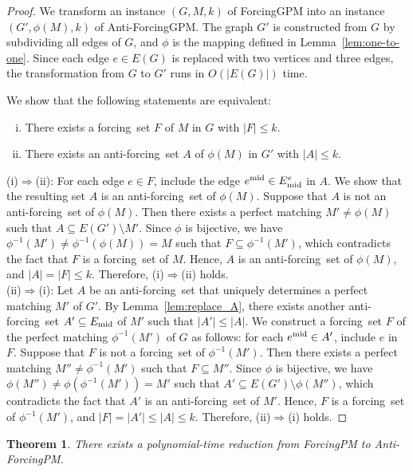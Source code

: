\documentclass[a4paper,10pt]{article}
\newtheorem{theorem}{Theorem}
\newcommand{\FS}{\rm forcing~set}
\newcommand{\AFS}{\rm anti-forcing~set}
\newcommand{\FGPM}{\sc ForcingGPM} %
\newcommand{\AFGPM}{\sc Anti-ForcingGPM}
\newcommand{\FPM}{\sc ForcingPM} %
\newcommand{\AFPM}{\sc Anti-ForcingPM}
\begin{document}
\begin{proof}
We transform an instance $(G, M, k)$ of {\FGPM} into an instance $(G', \phi(M), k)$ of {\AFGPM}.
The graph $G'$ is constructed from $G$ by subdividing all edges of $G$, and $\phi$ is the mapping defined in Lemma~\ref{lem:one-to-one}.
Since each edge $e \in E(G)$ is replaced with two vertices and three edges, the transformation from $G$ to $G'$ runs in $O(|E(G)|)$ time.

We show that the following statements are equivalent:
\begin{enumerate}[(i)]
    \item There exists a {\FS} $F$ of $M$ in $G$ with $|F| \le k$.
    \item There exists an {\AFS} $A$ of $\phi(M)$ in $G'$ with $|A| \le k$.
\end{enumerate}

\noindent (i)$\Rightarrow$(ii):
For each edge $e \in F$, include the edge $e^{\textnormal{mid}} \in E^e_{\textnormal{mid}}$ in $A$.
We show that the resulting set $A$ is an {\AFS} of $\phi(M)$.
Suppose that $A$ is not an {\AFS} of $\phi(M)$.
Then there exists a perfect matching $M' \neq \phi(M)$ such that $A \subseteq E(G') \setminus M'$.
Since $\phi$ is bijective, we have $\phi^{-1}(M') \neq \phi^{-1}(\phi(M)) = M$ such that $F \subseteq \phi^{-1}(M')$, which contradicts the fact that $F$ is a {\FS} of $M$.
Hence, $A$ is an {\AFS} of $\phi(M)$, and $|A| = |F| \le k$.
Therefore, (i)$\Rightarrow$(ii) holds.\\

\noindent (ii)$\Rightarrow$(i):
Let $A$ be an {\AFS} that uniquely determines a perfect matching $M'$ of $G'$.
By Lemma~\ref{lem:replace_A}, there exists another {\AFS} $A' \subseteq E_{\textnormal{mid}}$ of $M'$ such that $|A'| \le |A|$.
We construct a {\FS} $F$ of the perfect matching $\phi^{-1}(M')$ of $G$ as follows: for each $e^{\textnormal{mid}} \in A'$, include $e$ in $F$.
Suppose that $F$ is not a {\FS} of $\phi^{-1}(M')$.
Then there exists a perfect matching $M'' \neq \phi^{-1}(M')$ such that $F \subseteq M''$.
Since $\phi$ is bijective, we have $\phi(M'') \neq \phi(\phi^{-1}(M')) = M'$ such that $A' \subseteq E(G') \setminus \phi(M'')$, which contradicts the fact that $A'$ is an {\AFS} of $M'$.
Hence, $F$ is a {\FS} of $\phi^{-1}(M')$, and $|F| = |A'| \le |A| \le k$.
Therefore, (ii)$\Rightarrow$(i) holds.
\end{proof}

\begin{theorem} \label{thm:FPMtoAFPM_reduction}
There exists a polynomial-time reduction from {\FPM} to {\AFPM}.
\end{theorem}
\end{document}
